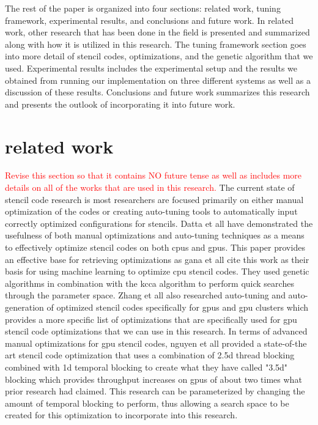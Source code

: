 \documentclass[conference]{IEEEtran}
\newcommand {\todo}[1] {\textcolor{red}{#1}}
\begin{document}
	The rest of the paper is organized into four sections: related work, tuning framework, experimental results, and conclusions and future work. In related work, other research that has been done in the field is presented and summarized along with how it is utilized in this research. The tuning framework section goes into more detail of stencil codes, optimizations, and the genetic algorithm that we used. Experimental results includes the experimental setup and the results we obtained from running our implementation on three different systems as well as a discussion of these results. Conclusions and future work summarizes this research and presents the outlook of incorporating it into future work.

\section{related work}
	\todo{Revise this section so that it contains NO future tense as well as includes more details on all of the works that are used in this research.}
	The current state of stencil code research is most researchers are focused primarily on either manual optimization of the codes or creating auto-tuning tools to automatically input correctly optimized configurations for stencils. Datta et all have demonstrated the usefulness of both manual optimizations and auto-tuning techniques as a means to effectively optimize stencil codes on both cpus and gpus\cite{Datta}. This paper provides an effective base for retrieving optimizations as gana et all cite this work as their basis for using machine learning to optimize cpu stencil codes. They used genetic algorithms in combination with the kcca algorithm to perform quick searches through the parameter space\cite{gana}. Zhang et all also researched auto-tuning and auto-generation of optimized stencil codes specifically for gpus and gpu clusters which provides a more specific list of optimizations that are specifically used for gpu stencil code optimizations that we can use in this research\cite{zhang}. In terms of advanced manual optimizations for gpu stencil codes, nguyen et all provided a state-of-the art stencil code optimization that uses a combination of 2.5d thread blocking combined with 1d temporal blocking to create what they have called "3.5d" blocking which provides throughput increases on gpus of about two times what prior research had claimed\cite{nguy}. This research can be parameterized by changing the amount of temporal blocking to perform, thus allowing a search space to be created for this optimization to incorporate into this research.
	
\end{document}
